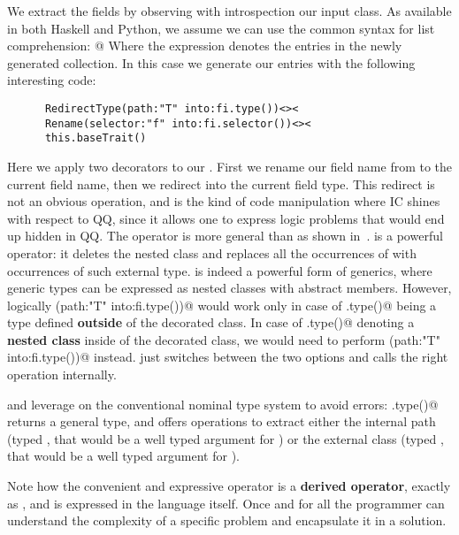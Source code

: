 We extract the fields by observing with introspection
our input class.
As available in both Haskell and Python, we assume we can use the common syntax for list comprehension:
\Q@CollectionType[e| x in list]@
Where the expression \Q@e@ denotes the entries in the newly generated collection.
In this case we generate our entries with the following interesting code:

\begin{lstlisting}
      RedirectType(path:"T" into:fi.type())<><
      Rename(selector:"f" into:fi.selector())<><
      this.baseTrait()
\end{lstlisting}

Here we apply two decorators to our \Q@baseTrait@. First
we rename our field name from \Q@f@ to the current field name, then
 we redirect \Q@T@ into the current field type.
 This redirect is not an obvious operation, and is the kind of code manipulation where IC shines
with respect to QQ, since it allows one to express logic problems that would end up hidden in QQ.
 The operator \Q@RedirectType@ is more general than \Q@Redirect@ as shown in~\cite{servetto2014meta}.
 \Q@Redirect@ is a powerful operator:
 it deletes the nested class \Q@T@ and replaces all
 the occurrences of \Q@T@ with occurrences of such external type.
 \Q@Redirect@ is indeed a powerful form of generics,
 where generic types can be expressed as nested classes with abstract members.
 However, logically \Q@Redirect(path:"T" into:fi.type())@
 would work only in case of \Q@fi.type()@ being a type
 defined \textbf{outside} of the decorated class.
 In case of \Q@fi.type()@ denoting a \textbf{nested class} inside of the decorated class,
 we would need to perform \Q@Rename(path:"T" into:fi.type())@ instead.
 \Q@RedirectType@ just switches between the two options and calls the right operation internally.

\Q@Rename@ and \Q@Redirect@ leverage on the
conventional nominal type system to avoid errors:
 \Q@fi.type()@ returns a general \Q@Type@ type, and offers operations to extract either
 the internal path (typed \Q@Path@, that would be a well typed argument for \Q@Rename@)
 or the external class (typed \Q@Class@, that would be a well typed argument for \Q@Redirect@).

 Note how the convenient and expressive operator \Q@RedirectType@ is a \textbf{derived operator},
 exactly as \Q@Stringable@,
 and is expressed in the language itself. Once and for all the programmer can understand
 the complexity of a specific problem and encapsulate it in a solution.

